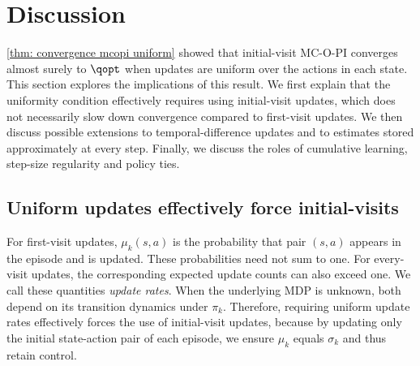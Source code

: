 \section{Discussion}
\label{sec: discussion}

\autoref{thm: convergence mcopi uniform} showed that initial-visit MC-O-PI converges almost surely to $\qopt$
when updates are uniform over the actions in each state.
%
%
This section explores the implications of this result.
We first explain that the uniformity condition effectively requires using initial-visit updates, which does not necessarily slow down convergence compared to first-visit updates.
We then discuss possible extensions to temporal-difference updates and to estimates stored approximately at every step.
Finally, we discuss the roles of cumulative learning, step-size regularity and policy ties.




\subsection{Uniform updates effectively force initial-visits}


For first-visit updates, $\mu_k(s,a)$ is the probability that pair $(s,a)$ appears in the episode and is updated. These probabilities need not sum to one. For every-visit updates, the corresponding expected update counts can also exceed one. We call these quantities \emph{update rates}. When the underlying MDP is unknown, both depend on its transition dynamics under $\pi_k$.
Therefore, requiring uniform update rates effectively forces the use of initial-visit updates,
because by updating only the initial state-action pair of each episode, we ensure $\mu_k$ equals $\sigma_k$ and thus retain control.


